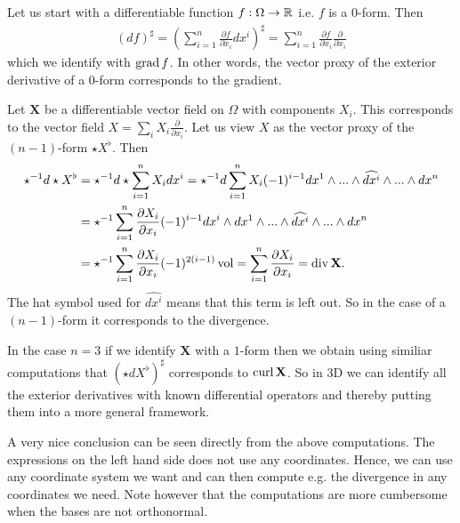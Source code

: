 \documentclass[../main.tex]{subfiles}
\begin{document}
Let us start with a differentiable function $f: \Omega \rightarrow \mathbb{R}$ i.e. 
$f$ is a $0$-form. Then
\begin{align*}
    (df)^\sharp = \left( \sum_{i=1}^n \frac{\partial f}{\partial x_i} dx^i 
        \right)^\sharp
    = \sum_{i=1}^n \frac{\partial f}{\partial x_i} \frac{\partial}{\partial x_i}
\end{align*}
which we identify with  $\operatorname{grad} f$. In other words, the vector proxy of the 
exterior derivative of a $0$-form corresponds to the gradient.

Let $\mathbf{X}$ be a differentiable vector field on $\Omega$ 
with components $X_i$. This corresponds to the vector field 
$X = \sum_i X_i \frac{\partial}{\partial x_i}$. Let us view
$X$ as the vector proxy 
of the $(n-1)$-form $\star X^\flat$. Then 
\begin{align*}
    \star^{-1} d\star X^\flat &= \star^{-1} d\star \sum_{i=1}^n X_i dx^i
    = \star^{-1} d \sum_{i=1}^n X_i (-1)^{i-1} 
        dx^1 \wedge ... \wedge \widehat{dx^i} 
        \wedge ... 
        \wedge dx^n
    \\ &= \star^{-1} \sum_{i=1}^n \frac{\partial X_i}{\partial x_i} (-1)^{i-1} 
        dx^i \wedge 
        dx^1 \wedge ... \wedge \widehat{dx^i} \wedge ... \wedge dx^n
    \\ &= \star^{-1} \sum_{i=1}^n \frac{\partial X_i}{\partial x_i} 
        (-1)^{2(i-1)} \operatorname{vol}
    = \sum_{i=1}^n \frac{\partial X_i}{\partial x_i}
    = \operatorname{div} \mathbf{X}.
\end{align*}
The hat symbol used for
$\widehat{dx^i}$ means that this term is left out. So in the case of a $(n-1)$-form
it corresponds to the divergence.

In the case $n=3$ if we identify $\mathbf{X}$ with a $1$-form then 
we obtain using similiar computations
that $(\star d X^\flat)^\sharp$ corresponds to  $\mathbf{\operatorname{curl}} \,\mathbf{X}$.
So in $3$D we can identify all the exterior derivatives with known differential
operators and thereby putting them into a more general framework.

A very nice conclusion can be seen directly from the above computations. The 
expressions on the left hand side does not use any coordinates. Hence, 
we can use any coordinate system we want and can then compute e.g. the 
divergence in any coordinates we need. Note however that the computations are
more cumbersome when the bases are not orthonormal.
\end{document}
